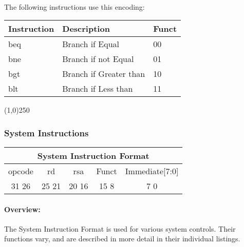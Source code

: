 \documentclass[letterpaper, 11pt]{article}
\begin{document}
\paragraph{}The following instructions use this encoding: \\
\begin{center}
	\begin{tabular}{|l|l|l|} \hline
			Instruction & Description 				& Funct\\ \hline
			beq			& Branch if Equal			& 00 \\ \hline
			bne			& Branch if not Equal		& 01 \\ \hline
			bgt			& Branch if Greater than	& 10 \\ \hline
			blt			& Branch if Less than		& 11 \\ \hline

\end{tabular}
\end{center}
\begin{center}
	\line(1,0){250}
\end{center}

\subsubsection{System Instructions}
\begin{center}
	\begin{tabular}{|c|c|c|c|c|}
		\multicolumn{5}{c}{System Instruction Format}\\ \hline
			\hspace{2pt} opcode \hspace{2pt} & \hspace{5pt} rd \hspace{5pt} &  \hspace{4pt} rsa \hspace{4pt} & \hspace{10pt}Funct  \hspace{10pt} & \hspace{8pt} Immediate[7:0] \hspace{8pt}   \\	\hline
		31 \hfill 26& 25 \hfill 21 &20 \hfill  16& 15 \hfill  8&7 \hfill   0\\ \hline
		
	\end{tabular}
\end{center}
\paragraph{Overview:} The System Instruction Format is used for various system controls. Their functions
vary, and are described in more detail in their individual listings.
\end{document}

